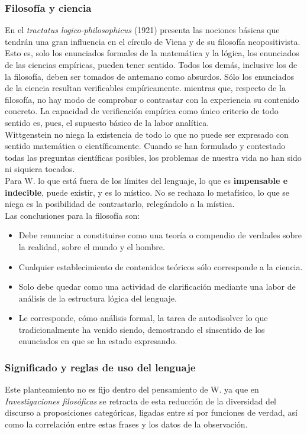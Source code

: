 \documentclass[a4paper, 11pt, twocolumn, spanish]{article}
\begin{document}
\subsubsection{Filosofía y ciencia}
\label{sec:org1e48bdc}
En el \emph{tractatus logico-philosophicus} (1921) presenta las nociones
básicas que tendrán una gran influencia en el círculo de Viena y de su
filosofía neopositivista. Esto es, solo los enunciados formales de la
matemática y la lógica, los enunciados de las ciencias empíricas,
pueden tener sentido. Todos los demás, inclusive los de la filosofía,
deben ser tomados de antemano como absurdos. Sólo los enunciados de la
ciencia resultan verificables empíricamente. mientras que, respecto de
la filosofía, no hay modo de comprobar o contrastar con la experiencia
su contenido concreto. La capacidad de verificación empírica como
único criterio de todo sentido es, pues, el supuesto básico de la
labor analítica.\\

Wittgenstein no niega la existencia de todo lo que no puede ser
expresado con sentido matemática o científicamente. Cuando se han
formulado y contestado todas las preguntas científicas posibles, los
problemas de nuestra vida no han sido ni siquiera tocados.\\

Para W. lo que está fuera de los límites del lenguaje, lo que es
\textbf{impensable e indecible}, puede existir, y es lo místico. No se
rechaza lo metafísico, lo que se niega es la posibilidad de
contrastarlo, relegándolo a la mística.\\

Las conclusiones para la filosofía son:
\begin{itemize}
\item Debe renunciar a constituirse como una teoría o compendio de
verdades sobre la realidad, sobre el mundo y el hombre.
\item Cualquier establecimiento de contenidos teóricos sólo corresponde
a la ciencia.
\item Solo debe quedar como una actividad de clarificación mediante una
labor de análisis de la estructura lógica del lenguaje.
\item Le corresponde, cómo análisis formal, la tarea de autodisolver lo
que tradicionalmente ha venido siendo, demostrando el sinsentido
de los enunciados en que se ha estado expresando.
\end{itemize}

\subsubsection{Significado y reglas de uso del lenguaje}
\label{sec:org2dd2738}
Este planteamiento no es fijo dentro del pensamiento de W. ya que en
\emph{Investigaciones filosóficas} se retracta de esta reducción de la
diversidad del discurso a proposiciones categóricas, ligadas entre sí
por funciones de verdad, así como la correlación entre estas frases y
los datos de la observación.\\
\end{document}
